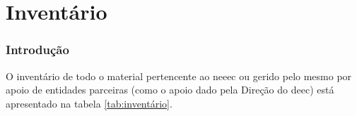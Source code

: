 
\part{Inventário}

\section{Introdução}
\label{inventario}

O inventário de todo o material pertencente ao \acrshort{neeec} ou gerido pelo mesmo por apoio de entidades parceiras (como o apoio dado pela Direção do \acrshort{deec}) está apresentado na tabela \ref{tab:inventário}.

